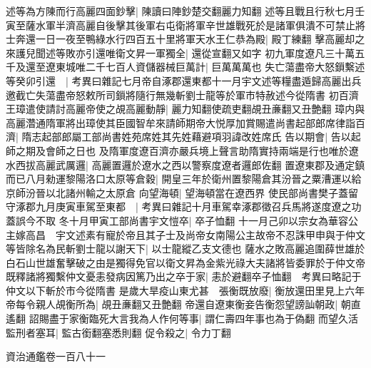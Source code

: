 述等為方陳而行高麗四面鈔擊|{
	陳讀曰陣鈔楚交翻麗力知翻}
述等且戰且行秋七月壬寅至薩水軍半濟高麗自後擊其後軍右屯衛將軍辛世雄戰死於是諸軍俱潰不可禁止將士奔還一日一夜至鴨綠水行四百五十里將軍天水王仁恭為殿|{
	殿丁練翻}
擊高麗却之來護兒聞述等敗亦引還唯衛文昇一軍獨全|{
	還從宣翻又如字}
初九軍度遼凡三十萬五千及還至遼東城唯二千七百人資儲器械巨萬計|{
	巨萬萬萬也}
失亡蕩盡帝大怒鎻繫述等癸卯引還　|{
	考異曰雜記七月帝自涿郡還東都十一月宇文述等糧盡遁歸高麗出兵邀截亡失蕩盡帝怒敕所司鎻將隨行無幾斬劉士龍等於軍市特赦述今從隋書}
初百濟王璋遣使請討高麗帝使之覘高麗動靜|{
	麗力知翻使疏吏翻覘丑亷翻又丑艶翻}
璋内與高麗濳通隋軍將出璋使其臣國智牟來請師期帝大悦厚加賞賜遣尚書起部郎席律詣百濟|{
	隋志起部郎屬工部尚書姓苑席姓其先姓藉避項羽諱改姓席氏}
告以期會|{
	告以起師之期及會師之日也}
及隋軍度遼百濟亦嚴兵境上聲言助隋實持兩端是行也唯於遼水西拔高麗武厲邏|{
	高麗置邏於遼水之西以警察度遼者邏郎佐翻}
置遼東郡及通定鎮而已八月勑運黎陽洛口太原等倉穀|{
	開皇三年於衛州置黎陽倉其汾晉之粟漕運以給京師汾晉以北諸州輸之太原倉}
向望海頓|{
	望海頓當在遼西界}
使民部尚書樊子蓋留守涿郡九月庚寅車駕至東都　|{
	考異曰雜記十月車駕幸涿郡徵召兵馬將遂度遼之功蓋誤今不取}
冬十月甲寅工部尚書宇文愷卒|{
	卒子恤翻}
十一月己卯以宗女為華容公主嫁高昌　宇文述素有寵於帝且其子士及尚帝女南陽公主故帝不忍誅甲申與于仲文等皆除名為民斬劉士龍以謝天下|{
	以士龍縱乙支文德也}
薩水之敗高麗追圍薛世雄於白石山世雄奮擊破之由是獨得免官以衛文昇為金紫光祿大夫諸將皆委罪於于仲文帝既釋諸將獨繫仲文憂恚發病因篤乃出之卒于家|{
	恚於避翻卒子恤翻　考異曰略記于仲文以下斬於市今從隋書}
是歲大旱疫山東尤甚　張衡既放廢|{
	衡放還田里見上六年}
帝每令親人覘衡所為|{
	覘丑亷翻又丑艶翻}
帝還自遼東衡妾告衡怨望謗訕朝政|{
	朝直遙翻}
詔賜盡于家衡臨死大言我為人作何等事|{
	謂仁壽四年事也為于偽翻}
而望久活監刑者塞耳|{
	監古銜翻塞悉則翻}
促令殺之|{
	令力丁翻}


資治通鑑卷一百八十一

